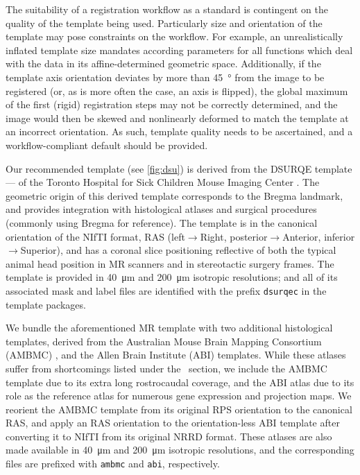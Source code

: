 The suitability of a registration workflow as a standard is contingent on the quality of the template being used.
Particularly size and orientation of the template may pose constraints on the workflow.
For example, an unrealistically inflated template size mandates according parameters for all functions which deal with the data in its affine-determined geometric space.
Additionally, if the template axis orientation deviates by more than \SI{45}{\degree} from the image to be registered (or, as is more often the case, an axis is flipped), the global maximum of the first (rigid) registration steps may not be correctly determined, and the image would then be skewed and nonlinearly deformed to match  the template at an incorrect orientation.
As such, template quality needs to be ascertained, and a workflow-compliant default should be provided.

Our recommended template (see \cref{fig:dsu}) is derived from the DSURQE template --- of the Toronto Hospital for Sick Children Mouse Imaging Center \cite{dsu}.
The geometric origin of this derived template corresponds to the Bregma landmark, and provides integration with histological atlases and surgical procedures (commonly using Bregma for reference).
The template is in the canonical orientation of the NIfTI format, RAS (left$\rightarrow$Right, posterior$\rightarrow$Anterior, inferior$\rightarrow$Superior), and has a coronal slice positioning reflective of both the typical animal head position in MR scanners and in stereotactic surgery frames.
The template is provided in \SI{40}{\micro\meter} and \SI{200}{\micro\meter} isotropic resolutions; 
and all of its associated mask and label files are identified with the prefix \textcolor{mg}{\texttt{dsurqec}} in the template packages.

We bundle the aforementioned MR template with two additional histological templates, derived from the Australian Mouse Brain Mapping Consortium (AMBMC) \cite{amb}, and the Allen Brain Institute (ABI) \cite{abi} templates.
While these atlases suffer from shortcomings listed under the ~section, we include the AMBMC template due to its extra long rostrocaudal coverage, and the ABI atlas due to its role as the reference atlas for numerous gene expression and projection maps.
We reorient the AMBMC template from its original RPS orientation to the canonical RAS, and apply an RAS orientation to the orientation-less ABI template after converting it to NIfTI from its original NRRD format.
These atlases are also made available in \SI{40}{\micro\meter} and \SI{200}{\micro\meter} isotropic resolutions, and the corresponding files are prefixed with \textcolor{mg}{\texttt{ambmc}} and \textcolor{mg}{\texttt{abi}}, respectively.

